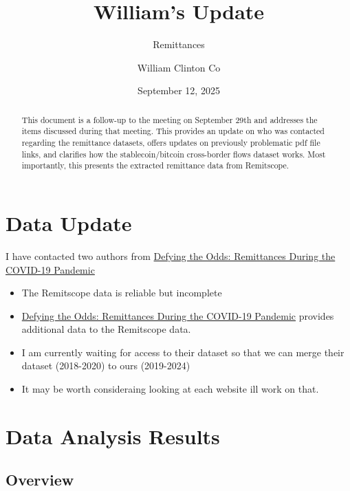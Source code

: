 \documentclass[
  11pt,
]{article}
\title{William's Update}
\subtitle{Remittances}
\author{William Clinton Co}
\date{September 12, 2025}
\providecommand{\tightlist}{%
  \setlength{\itemsep}{0pt}\setlength{\parskip}{0pt}}\usepackage{longtable,booktabs,array}
\renewcommand*\contentsname{Table of contents}
\newcommand\contentsname{Table of contents}
\begin{document}
\maketitle
\begin{abstract}
This document is a follow-up to the meeting on September 29th and
addresses the items discussed during that meeting. This provides an
update on who was contacted regarding the remittance datasets, offers
updates on previously problematic pdf file links, and clarifies how the
stablecoin/bitcoin cross-border flows dataset works. Most importantly,
this presents the extracted remittance data from Remitscope.
\end{abstract}

\renewcommand*\contentsname{Table of contents}
{
\hypersetup{linkcolor=}
\setcounter{tocdepth}{10}
\tableofcontents
}
\section{Data Update}\label{data-update}

I have contacted two authors from
\href{https://www.imf.org/en/Publications/WP/Issues/2021/07/16/Defying-the-Odds-Remittances-During-the-COVID-19-Pandemic-461321}{Defying
the Odds: Remittances During the COVID-19 Pandemic}

\begin{itemize}
\tightlist
\item
  The Remitscope data is reliable but incomplete
\item
  \href{https://www.imf.org/en/Publications/WP/Issues/2021/07/16/Defying-the-Odds-Remittances-During-the-COVID-19-Pandemic-461321}{Defying
  the Odds: Remittances During the COVID-19 Pandemic} provides
  additional data to the Remitscope data.
\item
  I am currently waiting for access to their dataset so that we can
  merge their dataset (2018-2020) to ours (2019-2024)
\item
  It may be worth consideraing looking at each website ill work on that.
\end{itemize}

\section{Data Analysis Results}\label{data-analysis-results}

\subsection{Overview}\label{overview}
\end{document}
